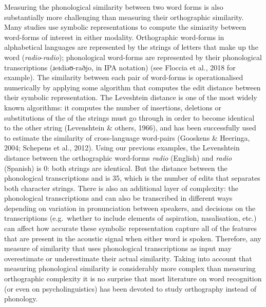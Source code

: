 \documentclass[
  english,
  man,floatsintext]{apa7}
\begin{document}
Measuring the phonological similarity between two word forms is also substantially more challenging than measuring their orthographic similarity. Many studies use symbolic representations to compute the simiarity between word-forms of interest in either modality. Orthographic word-forms in alphabetical languages are represented by the strings of letters that make up the word (\emph{radio}-\emph{radio}); phonological word-forms are represented by their phonological transcriptions (ɹeɪdiəʊ-raðjo, in IPA notation) (see Floccia et al., 2018 for example). The similarity between each pair of word-forms is operationalised numerically by applying some algorithm that computes the edit distance between their symbolic representation. The Leveshtein distance is one of the most widely known algorithms: it computes the number of insertions, deletions or substitutions of the of the strings must go through in order to become identical to the other string (Levenshtein \& others, 1966), and has been successfully used to estimate the similarity of cross-language word-pairs (Gooskens \& Heeringa, 2004; Schepens et al., 2012). Using our previous examples, the Levenshtein distance between the orthographic word-forms \emph{radio} (English) and \emph{radio} (Spanish) is 0: both strings are identical. But the distance between the phonological transcriptions and  is 35, which is the number of edits that separates both character strings. There is also an additional layer of complexity: the phonological transcriptions  and  can also be transcribed in different ways depending on variation in pronunciation between speakers, and decisions on the transcriptions (e.g.~whether to include elements of aspiration, nasalisation, etc.) can affect how accurate these symbolic representation capture all of the features that are present in the acoustic signal when either word is spoken. Therefore, any measure of similarity that uses phonological transcriptions as input may overestimate or underestimate their actual similarity. Taking into account that measuring phonological similarity is considerably more complex than measuring orthographic complexity it is no surprise that most literature on word recognition (or even on psycholinguistics) has been devoted to study orthography instead of phonology.
\end{document}
